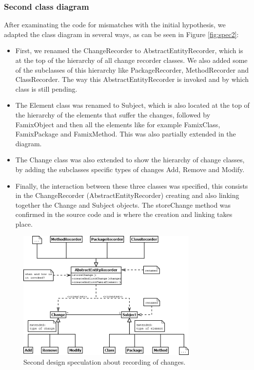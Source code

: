 \documentclass{article}
\begin{document}
\subsubsection{Second class diagram}
After examinating the code for mismatches with the initial hypothesis, we adapted the class diagram in several ways, as can be seen in Figure \ref{fig:spec2}:

\begin{itemize}
\item First, we renamed the ChangeRecorder to AbstractEntityRecorder, which is at the top of the hierarchy of all change recorder classes. We also added some of the subclasses of this hierarchy like PackageRecorder, MethodRecorder and ClassRecorder. The way this AbstractEntityRecorder is invoked and by which class is still pending.

\item The Element class was renamed to Subject, which is also located at the top of the hierarchy of the elements that suffer the changes, followed by FamixObject and then all the elements like for example FamixClass, FamixPackage and FamixMethod. This was also partially extended in the diagram.

\item The Change class was also extended to show the hierarchy of change classes, by adding the subclasses specific types of changes Add, Remove and Modify.

\item Finally, the interaction between these three classes was specified, this consists in the ChangeRecorder (AbstractEntityRecorder) creating and also linking together the Change and Subject objects. The storeChange method was confirmed in the source code and is where the creation and linking takes place.
\end{itemize}

\begin{figure}[h]
\centering
\includegraphics[width=0.8\textwidth]{Images/spec1}
\caption{Second design speculation about recording of changes.}
\label{fig:spec1}
\end{figure}
\end{document}
